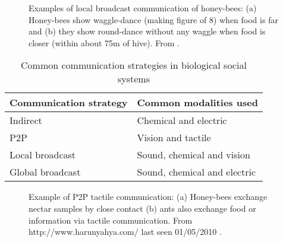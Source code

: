 \begin{figure}
\centering
{} 
\hspace{0.25cm}
\caption{Examples of local broadcast communication of honey-bees: (a) Honey-bees show waggle-dance (making figure of 8) when food is far and (b) they show round-dance without any waggle when food is closer (within about 75m of hive). From \protect{}.}
\label{fig:honey-bee-dances}
\end{figure}
\begin{table}
\caption{Common communication strategies in biological social systems}
\label{table:bio-comm-strategy}
\begin{center}
\begin{tabular}{|l|l|}
\hline 
\textbf{Communication strategy} & \textbf{Common modalities used}\\
\hline 
Indirect & Chemical and electric \\
P2P &  Vision and tactile\\
Local broadcast &  Sound, chemical and vision\\
Global broadcast & Sound, chemical and electric\\
\hline
\end{tabular}
\end{center}
\end{table}
\begin{figure}
\centering
{} 
\hspace{0.25cm}
\caption{Example of P2P tactile communication: (a) Honey-bees exchange nectar samples by close contact (b) ants also exchange food or information via tactile communication. \protect\newline  From http://www.harunyahya.com/ last seen 01/05/2010 .}
\label{fig:bees-ants-p2p-comm}
\end{figure}
